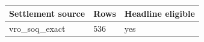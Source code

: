 \begin{tabular}{lll}
\toprule
Settlement source & Rows & Headline eligible \\
\midrule
vro\_soq\_exact & 536 & yes \\
\bottomrule
\end{tabular}
